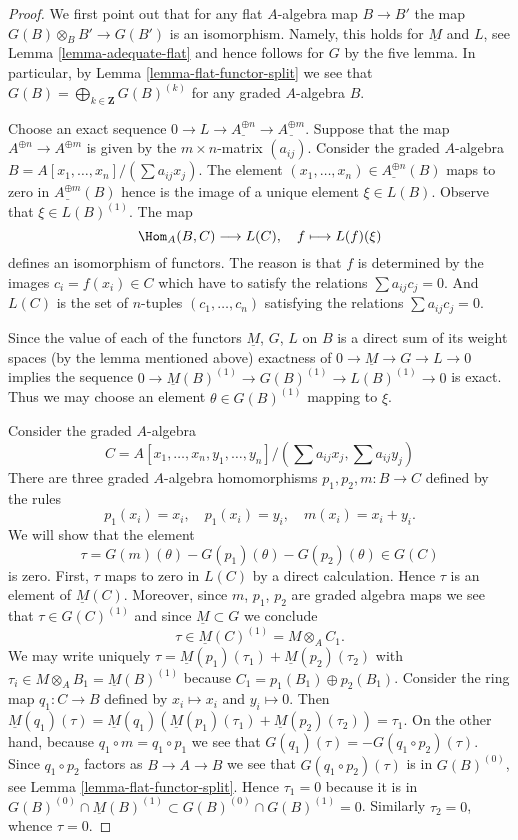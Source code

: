 \begin{proof}
We first point out that for any flat $A$-algebra map
$B \to B'$ the map $G(B) \otimes_B B' \to G(B')$ is an isomorphism.
Namely, this holds for $\underline{M}$ and $L$, see
Lemma \ref{lemma-adequate-flat}
and hence follows for $G$ by the five lemma. In particular, by
Lemma \ref{lemma-flat-functor-split}
we see that $G(B) = \bigoplus_{k \in \mathbf{Z}} G(B)^{(k)}$
for any graded $A$-algebra $B$.

\medskip\noindent
Choose an exact sequence
$0 \to L \to \underline{A^{\oplus n}} \to \underline{A^{\oplus m}}$.
Suppose that the map $A^{\oplus n} \to A^{\oplus m}$ is given by the
$m \times n$-matrix $(a_{ij})$. Consider the graded $A$-algebra
$B = A[x_1, \ldots, x_n]/(\sum a_{ij}x_j)$. The element
$(x_1, \ldots, x_n) \in \underline{A^{\oplus n}}(B)$ maps to zero in
$\underline{A^{\oplus m}}(B)$ hence is the image of a unique element
$\xi \in L(B)$. Observe that $\xi \in L(B)^{(1)}$. The map
$$
\Hom_A(B, C) \longrightarrow L(C), \quad
f \longmapsto L(f)(\xi)
$$
defines an isomorphism of functors. The reason is that $f$ is
determined by the images $c_i = f(x_i) \in C$ which have to
satisfy the relations $\sum a_{ij}c_j = 0$. And $L(C)$ is the
set of $n$-tuples $(c_1, \ldots, c_n)$ satisfying the relations
$\sum a_{ij} c_j = 0$.

\medskip\noindent
Since the value of each of the functors $\underline{M}$, $G$, $L$
on $B$ is a direct sum of its weight spaces (by the lemma mentioned
above) exactness of $0 \to \underline{M} \to G \to L \to 0$ implies
the sequence $0 \to \underline{M}(B)^{(1)} \to G(B)^{(1)} \to L(B)^{(1)} \to 0$
is exact. Thus we may choose an element $\theta \in G(B)^{(1)}$ mapping
to $\xi$.

\medskip\noindent
Consider the graded $A$-algebra
$$
C = A[x_1, \ldots, x_n, y_1, \ldots, y_n]/
(\sum a_{ij}x_j, \sum a_{ij}y_j)
$$
There are three graded $A$-algebra homomorphisms $p_1, p_2, m : B \to C$
defined by the rules
$$
p_1(x_i) = x_i, \quad
p_1(x_i) = y_i, \quad
m(x_i) = x_i + y_i.
$$
We will show that the element
$$
\tau = G(m)(\theta) - G(p_1)(\theta) - G(p_2)(\theta) \in G(C)
$$
is zero. First, $\tau$ maps to zero in $L(C)$ by a direct calculation.
Hence $\tau$ is an element of $\underline{M}(C)$.
Moreover, since $m$, $p_1$, $p_2$ are graded algebra maps we see
that $\tau \in G(C)^{(1)}$ and since $\underline{M} \subset G$
we conclude
$$
\tau \in \underline{M}(C)^{(1)} = M \otimes_A C_1.
$$
We may write uniquely
$\tau = \underline{M}(p_1)(\tau_1) + \underline{M}(p_2)(\tau_2)$ with
$\tau_i \in M \otimes_A B_1 = \underline{M}(B)^{(1)}$ because
$C_1 = p_1(B_1) \oplus p_2(B_1)$.
Consider the ring map $q_1 : C \to B$ defined by $x_i \mapsto x_i$ and
$y_i \mapsto 0$. Then
$\underline{M}(q_1)(\tau) =
\underline{M}(q_1)(\underline{M}(p_1)(\tau_1) + \underline{M}(p_2)(\tau_2)) =
\tau_1$.
On the other hand, because
$q_1 \circ m = q_1 \circ p_1$ we see that
$G(q_1)(\tau) = - G(q_1 \circ p_2)(\tau)$. Since $q_1 \circ p_2$ factors as
$B \to A \to B$ we see that $G(q_1 \circ p_2)(\tau)$ is in
$G(B)^{(0)}$, see
Lemma \ref{lemma-flat-functor-split}.
Hence $\tau_1 = 0$ because it is in
$G(B)^{(0)} \cap \underline{M}(B)^{(1)} \subset
G(B)^{(0)} \cap G(B)^{(1)} = 0$.
Similarly $\tau_2 = 0$, whence $\tau = 0$.


\end{proof}
